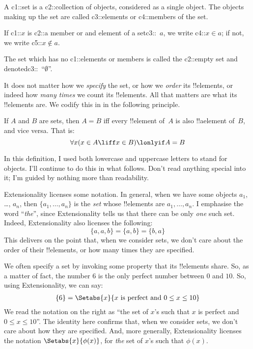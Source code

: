 A {{c1::set}} is a {{c2::collection of objects}}, considered as a single object. The objects making up the set are called {{c3::elements}} or {{c4::members}} of the set.

If {{c1::$x$}} is {{c2::a member or and element}} of a set{{c3::~$a$}}, we write {{c4::$x \in a$}}; if not, we write {{c5::$x \notin a$}}.

The set which has no {{c1::elements or members}} is called the {{c2::empty set}} and denoted{{c3::~``$\emptyset$''}}.

It does not matter how we \emph{specify} the set, or how we \emph{order} its !!{element}s, or indeed how \emph{many times} we count its !!{element}s. All that matters are what its !!{element}s are. We codify this in in the following principle.
\begin{defn}[Extensionality]
	If $A$ and $B$ are sets, then $A = B$ iff every !!{element} of~$A$ is also !!a{element} of~$B$, and
	vice versa. That is: $$\forall x(x \in A \liff x \in B) \lonlyif A = B$$
\end{defn}\noindent
In this definition, I used both lowercase and uppercase letters to stand for objects. I'll continue to do this in what follows. Don't read anything special into it; I'm guided by nothing more than readability.

Extensionality licenses some notation. In general, when we have some objects $a_{1}$, \dots, $a_{n}$, then $\{a_{1}, \dots, a_{n}\}$ is the \emph{set} whose !!{element}s are $a_1, \ldots, a_n$. I emphasise the word ``\emph{the}'', since Extensionality tells us that there can be only \emph{one} such set. Indeed, Extensionality also licenses the following:
	$$\{a, a, b\} = \{a, b\} = \{b,a\}$$
This delivers on the point that, when we consider sets, we don't care about the order of their !!{element}s, or how many times they are specified.

We often specify a set by invoking some property that its !!{element}s share. So, as a matter of fact, the number $6$ is the only perfect number between $0$ and $10$. So, using Extensionality, we can say:
\begin{align*}
	\{6\} =\Setabs{x}{x\text{ is perfect and }0 \leq x \leq 10}
\end{align*}
We read the notation on the right as ``the set of $x$'s such that $x$ is perfect and $0 \leq x \leq 10$''. The identity here confirms that, when we consider sets, we don't care about how they are specified. And, more generally, Extensionality licenses the notation $\Setabs{x}{\phi(x)}$, for \emph{the} set of $x$'s such that $\phi(x)$.

